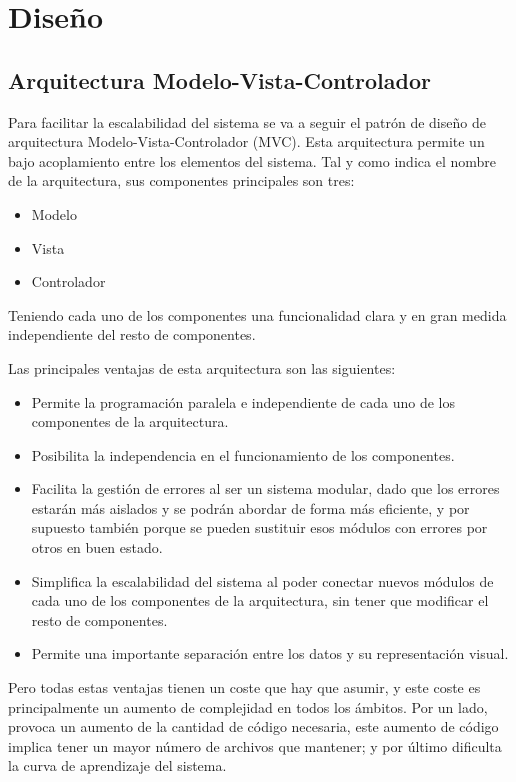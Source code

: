 \chapter{Diseño}

\section{Arquitectura Modelo-Vista-Controlador}

Para facilitar la escalabilidad del sistema se va a seguir el patrón de diseño de arquitectura Modelo-Vista-Controlador (MVC). Esta arquitectura permite un bajo acoplamiento entre los elementos del sistema. Tal y como indica el nombre de la arquitectura, sus componentes principales son tres:

\begin{itemize}
\item Modelo
\item Vista
\item Controlador
\end{itemize}

Teniendo cada uno de los componentes una funcionalidad clara y en gran medida independiente del resto de componentes.

Las principales ventajas de esta arquitectura son las siguientes:

\begin{itemize}
\item Permite la programación paralela e independiente de cada uno de los componentes de la arquitectura.
\item Posibilita la independencia en el funcionamiento de los componentes.
\item Facilita la gestión de errores al ser un sistema modular, dado que los errores estarán más aislados y se podrán abordar de forma más eficiente, y por supuesto también porque se pueden sustituir esos módulos con errores por otros en buen estado.
\item Simplifica la escalabilidad del sistema al poder conectar nuevos módulos de cada uno de los componentes de la arquitectura, sin tener que modificar el resto de componentes.
\item Permite una importante separación entre los datos y su representación visual.
\end{itemize}

Pero todas estas ventajas tienen un coste que hay que asumir, y este coste es principalmente un aumento de complejidad en todos los ámbitos. Por un lado, provoca un aumento de la cantidad de código necesaria, este aumento de código implica tener un mayor número de archivos que mantener; y por último dificulta la curva de aprendizaje del sistema.

